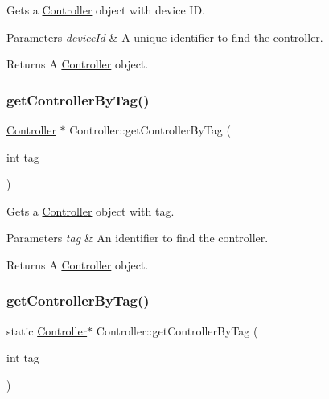 Gets a \hyperlink{classController}{Controller} object with device ID.


\begin{DoxyParams}{Parameters}
{\em device\+Id} & A unique identifier to find the controller. \\
\hline
\end{DoxyParams}
\begin{DoxyReturn}{Returns}
A \hyperlink{classController}{Controller} object. 
\end{DoxyReturn}
\mbox{\label{classController_ad058b420928dce690a9274a53ddfb04d}} 
\subsubsection{\texorpdfstring{get\+Controller\+By\+Tag()}{getControllerByTag()}\hspace{0.1cm}{\footnotesize\ttfamily [1/2]}}
{\footnotesize\ttfamily \hyperlink{classController}{Controller} $\ast$ Controller\+::get\+Controller\+By\+Tag (\begin{DoxyParamCaption}\item[{int}]{tag }\end{DoxyParamCaption})\hspace{0.3cm}{\ttfamily [static]}}

Gets a \hyperlink{classController}{Controller} object with tag.


\begin{DoxyParams}{Parameters}
{\em tag} & An identifier to find the controller. \\
\hline
\end{DoxyParams}
\begin{DoxyReturn}{Returns}
A \hyperlink{classController}{Controller} object. 
\end{DoxyReturn}
\mbox{\label{classController_ac2fe9d842f17b076d3610ce08ec93334}} 
\subsubsection{\texorpdfstring{get\+Controller\+By\+Tag()}{getControllerByTag()}\hspace{0.1cm}{\footnotesize\ttfamily [2/2]}}
{\footnotesize\ttfamily static \hyperlink{classController}{Controller}$\ast$ Controller\+::get\+Controller\+By\+Tag (\begin{DoxyParamCaption}\item[{int}]{tag }\end{DoxyParamCaption})\hspace{0.3cm}{\ttfamily [static]}}

